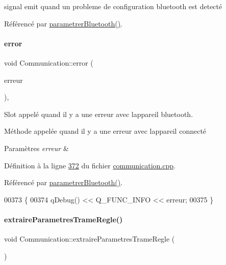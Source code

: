 signal emit quand un probleme de configuration bluetooth est detecté 



Référencé par \hyperlink{communication_8cpp_source_l00059}{parametrer\+Bluetooth()}.

\mbox{\label{class_communication_af95addb3c2bc178cfd7c92c6f94680a4}} 
\paragraph{\texorpdfstring{error}{error}}
{\footnotesize\ttfamily void Communication\+::error (\begin{DoxyParamCaption}\item[{Q\+Bluetooth\+Local\+Device\+::\+Error}]{erreur }\end{DoxyParamCaption})\hspace{0.3cm}{\ttfamily [private]}, {\ttfamily [slot]}}



Slot appelé quand il y a une erreur avec l\textquotesingle{}appareil bluetooth. 

Méthode appelée quand il y a une erreur avec l\textquotesingle{}appareil connecté


\begin{DoxyParams}{Paramètres}
{\em erreur} & \\
\hline
\end{DoxyParams}


Définition à la ligne \hyperlink{communication_8cpp_source_l00372}{372} du fichier \hyperlink{communication_8cpp_source}{communication.\+cpp}.



Référencé par \hyperlink{communication_8cpp_source_l00059}{parametrer\+Bluetooth()}.


\begin{DoxyCode}
00373 \{
00374     qDebug() << Q\_FUNC\_INFO << erreur;
00375 \}
\end{DoxyCode}
\mbox{\label{class_communication_aa7fd74ea88ca7b28cb00e6b74b902394}} 
\paragraph{\texorpdfstring{extraire\+Parametres\+Trame\+Regle()}{extraireParametresTrameRegle()}}
{\footnotesize\ttfamily void Communication\+::extraire\+Parametres\+Trame\+Regle (\begin{DoxyParamCaption}{ }\end{DoxyParamCaption})\hspace{0.3cm}{\ttfamily [private]}}



